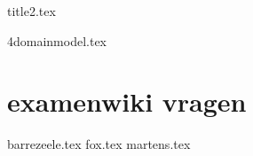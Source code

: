 \documentclass[a4paper,11pt]{article}
\begin{document}


{title2.tex}

\clearpage

\thispagestyle{empty}

\tableofcontents

\clearpage

\begin{comment}

{1systemsanalysis.tex}

\end{comment}


\begin{comment}

{1informatiesystemen.tex}

{2uml.tex}

{3buziness.tex}






\end{comment}


{4domainmodel.tex}



\begin{comment}



{5requirementsmodel.tex}
{6dynamischmodelleren.tex}
{7applicatielaag.tex}
{8implementationdiagram.tex}
{8deploymentdiagram.tex}

\end{comment}

\section{examenwiki vragen}
{barrezeele.tex}
{fox.tex}
{martens.tex}




\listofalgorithms
\clearpage
\listoffigures
\clearpage
\listoftables
\clearpage

\printglossary[title=Termen,toctitle=Lijst van termen]

\printglossary[type=\acronymtype]


\clearpage
\printsolutions
\end{document}
